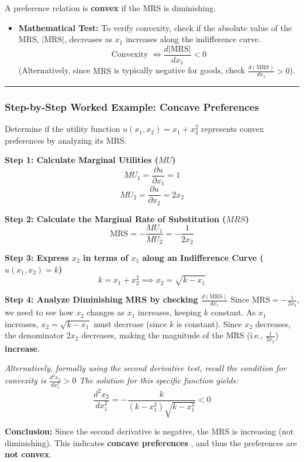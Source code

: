 \documentclass{article}
\begin{document}
A preference relation is \textbf{convex} if the MRS is diminishing.

\begin{itemize}
    \item \textbf{Mathematical Test:} To verify convexity, check if the absolute value of the MRS, $|\text{MRS}|$, decreases as $x_1$ increases along the indifference curve. \[\text{Convexity } \iff \frac{d|\text{MRS}|}{dx_1} < 0\] (Alternatively, since $\text{MRS}$ is typically negative for goods, check $\frac{d(\text{MRS})}{dx_1} > 0$).
\end{itemize}

\vspace{1em}\hrule\vspace{1em}

\subsubsection*{Step-by-Step Worked Example: Concave Preferences}

Determine if the utility function $u(x_1, x_2) = x_1 + x_2^2$ represents convex preferences by analyzing its MRS.

\textbf{Step 1: Calculate Marginal Utilities ($MU$)} \[MU_1 = \frac{\partial u}{\partial x_1} = 1\] \[MU_2 = \frac{\partial u}{\partial x_2} = 2x_2\]

\textbf{Step 2: Calculate the Marginal Rate of Substitution ($MRS$)} \[\text{MRS} = -\frac{MU_1}{MU_2} = -\frac{1}{2x_2}\]

\textbf{Step 3: Express $x_2$ in terms of $x_1$ along an Indifference Curve ($u(x_1, x_2) = k$)} \[k = x_1 + x_2^2 \implies x_2 = \sqrt{k - x_1}\]

\textbf{Step 4: Analyze Diminishing MRS by checking $\frac{d(\text{MRS})}{dx_1}$}
Since $\text{MRS} = -\frac{1}{2x_2}$, we need to see how $x_2$ changes as $x_1$ increases, keeping $k$ constant. As $x_1$ increases, $x_2 = \sqrt{k - x_1}$ must decrease (since $k$ is constant). Since $x_2$ decreases, the denominator $2x_2$ decreases, making the magnitude of the $\text{MRS}$ (i.e., $\frac{1}{2x_2}$) \textbf{increase}.

\textit{Alternatively, formally using the second derivative test, recall the condition for convexity is $\frac{d^2 x_2}{dx_1^2} > 0$ The solution for this specific function yields:} \[\frac{d^2 x_2}{dx_1^2} = -\frac{k}{(k - x_1^2) \sqrt{k - x_1^2}} < 0\]

\textbf{Conclusion:} Since the second derivative is negative, the MRS is increasing (not diminishing). This indicates \textbf{concave preferences} , and thus the preferences are \textbf{not convex}.
\end{document}
